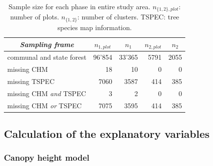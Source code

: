 \documentclass[remotesensing,article,submit,moreauthors,pdftex,10pt,a4paper]{mdpi}
\begin{document}
\begin{table}[H]
	\begin{center}
		\caption{Sample size for each phase in entire study area. $n_{\{1,2\},plot}$: number of plots. $n_{\{1,2\}}$: number of clusters. TSPEC: tree species map information.}
		\vspace{0.2cm}
		\label{tab:ssize}
		{\small %
			\begin{tabular}{l|r|r|r|r}
				\hline
				\multicolumn{1}{c|}{\textit{Sampling frame}} & \multicolumn{1}{c|}{\textbf{$n_{1,plot}$}}  & \multicolumn{1}{c|}{\textbf{$n_1$}}  & \multicolumn{1}{c|}{\textbf{$n_{2,plot}$}}  & \multicolumn{1}{c}{\textbf{$n_2$}} \\ %
				\hline \hline
				communal and state forest & 96'854 & 33'365 & 5791 & 2055\\
				\hspace{5mm} \footnotesize missing CHM & \footnotesize 18 & \footnotesize 10 & \footnotesize 0 & \footnotesize 0\\ %
				\hspace{5mm} \footnotesize missing TSPEC & \footnotesize 7060  & \footnotesize 3587 & \footnotesize 414 & \footnotesize 385\\ %
				\hspace{5mm} \footnotesize missing CHM \textit{and} TSPEC & \footnotesize 3 & \footnotesize 2 & \footnotesize 0 & \footnotesize 0\\ %
				\hspace{5mm} \footnotesize missing CHM \textit{or} TSPEC & \footnotesize 7075 & \footnotesize 3595 & \footnotesize 414 & \footnotesize 385\\ %
				\hline \hline
			\end{tabular}
		} %
	\end{center}
\end{table}


\subsection{Calculation of the explanatory variables}
\label{sec:expvarcalc}

\subsubsection{Canopy height model}
\end{document}

